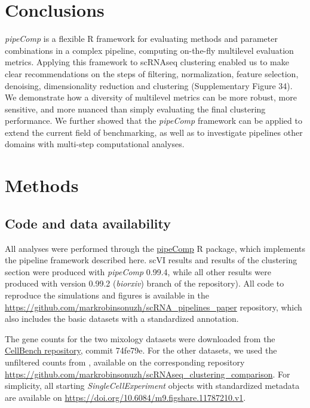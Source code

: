 \documentclass{bmcart}
\begin{document}
\section*{Conclusions}

\textit{pipeComp} is a flexible R framework for evaluating methods and parameter combinations in a complex pipeline, computing on-the-fly multilevel evaluation metrics. Applying this framework to scRNAseq clustering enabled us to make {\color{red}clear} recommendations on the steps of filtering, normalization, feature selection, denoising, dimensionality reduction and clustering (Supplementary Figure 34). We demonstrate how a diversity of multilevel metrics can be more robust, more sensitive, and more nuanced than simply evaluating the final clustering performance. We {\color{red}further showed} that the \textit{pipeComp} framework can be applied to extend the current field of benchmarking, as well as to investigate pipelines other domains with multi-step computational analyses.

\section*{Methods}

\subsection*{Code and data availability}

All analyses were performed through the \href{https://github.com/plger/pipeComp}{pipeComp} R package, which implements the pipeline framework described here. scVI results and results of the clustering section were produced with \textit{pipeComp} 0.99.4, while all other results were produced with version 0.99.2 (\textit{biorxiv}) branch of the repository). All code to reproduce the simulations and figures is available in the \url{https://github.com/markrobinsonuzh/scRNA\_pipelines\_paper} repository, which also includes the basic datasets with a standardized annotation.

The gene counts for the two mixology datasets were downloaded from the  \href{https://github.com/LuyiTian/CellBench_data/data/sincell_with_class.RData}{CellBench repository}, commit 74fe79e. For the other datasets, we used the unfiltered counts from \cite{duoClustering2018}, available on the corresponding repository \url{https://github.com/markrobinsonuzh/scRNAseq\_clustering\_comparison}. For simplicity, all starting \textit{SingleCellExperiment} objects with standardized metadata are available on \url{https://doi.org/10.6084/m9.figshare.11787210.v1}.
\end{document}
